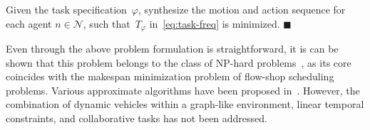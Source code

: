 \begin{problem}\label{prob:formulation}
Given the task specification~$\varphi$,
synthesize the motion and action
sequence for each agent $n\in \mathcal{N}$,
such that~$T_{\varphi}$ in~\eqref{eq:task-freq} is minimized.
\hfill $\blacksquare$
\end{problem}
Even through the above problem formulation is straightforward,
it is can be shown that this problem belongs to the class of NP-hard
problems~\cite{hochba1997approximation, bovet1994introduction},
as its core coincides with the makespan minimization problem
of flow-shop scheduling problems.
Various approximate algorithms have been proposed in~\cite{khamis2015multi, hoos2004stochastic}.
However,
the combination of dynamic vehicles within a graph-like environment,
linear temporal constraints,
and collaborative tasks has not been addressed.
